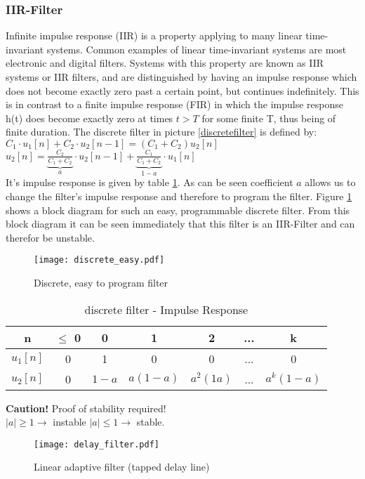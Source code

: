 \subsubsection{IIR-Filter}
Infinite impulse response (IIR) is a property applying to many linear time-invariant systems. Common examples of linear time-invariant systems are most electronic and digital filters. Systems with this property are known as IIR systems or IIR filters, and are distinguished by having an impulse response which does not become exactly zero past a certain point, but continues indefinitely. This is in contrast to a finite impulse response (FIR) in which the impulse response h(t) does become exactly zero at times $t > T$ for some finite T, thus being of finite duration.
The discrete filter in picture \ref{discretefilter} is defined by:\\ 
$C_1\cdot u_1[n] + C_2\cdot u_2[n-1] = (C_1+C_2 )u_2[n]$\\ 
$u_2[n]= \underbrace{\frac{C_2}{C_1+C_2}}_{a}\cdot u_2[n-1] + \underbrace{\frac{C_1}{C_1+C_2}}_{1-a}\cdot u_1[n]$\\
It's impulse response is given by table \ref{tab:prog_filter_Impulse_Resp}. As can be seen coefficient $a$ allows us to change the filter's impulse response and therefore to program the filter. Figure \ref{discreteeasy} shows a block diagram for such an easy, programmable discrete filter. From this block diagram it can be seen immediately that this filter is an IIR-Filter and can therefor be unstable.
\begin{figure}[H]
	\centering
	\texttt{[image: discrete\_easy.pdf]}
	\caption{Discrete, easy to program filter}
	\label{discreteeasy} 
\end{figure}

\begin{table}
	\caption{discrete filter - Impulse Response }	
	\label{tab:prog_filter_Impulse_Resp}
	\centering
\begin{tabular}[H]{|c|cccccc|}
\hline
	n & $\leq$ 0 & 0 &1 &2 & ... &k\\
	\hline
	$u_1[n]$& 0 & 1 & 0 & 0 & ... &0\\
	$u_2[n]$& 0 & $1-a$ & $a(1-a)$&$ a^2(1a) $& ... & $a^k (1-a)$\\
	\hline
\end{tabular}
\end{table}

\textbf{Caution!} Proof of stability required! \\ $|a| \geq 1 \rightarrow $ instable \pfeil $|a| \leq 1 \rightarrow$ stable.
\begin{figure}[H]
	\centering
	\texttt{[image: delay\_filter.pdf]}
	\caption{Linear adaptive filter (tapped delay line)}
	\label{delayfilter} 
\end{figure}

